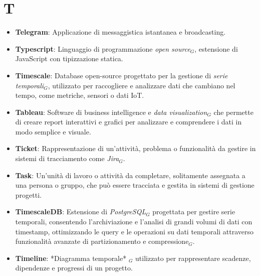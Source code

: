 \section{T}
\begin{itemize}
    \item \textbf{Telegram}: Applicazione di messaggistica istantanea e broadcasting.
    \item \textbf{Typescript}: Linguaggio di programmazione \textit{open source}$_G$, estensione di JavaScript con tipizzazione statica.
    \item \textbf{Timescale}: Database open-source progettato per la gestione di \textit{serie temporali$_G$}, utilizzato per raccogliere e analizzare dati che cambiano nel tempo, come metriche, sensori o dati IoT.
    \item \textbf{Tableau}: Software di business intelligence e \textit{data visualization$_G$} che permette di creare report interattivi e grafici per analizzare e comprendere i dati in modo semplice e visuale.
     \item \textbf{Ticket}: Rappresentazione di un’attività, problema o funzionalità da gestire in sistemi di tracciamento come \textit{Jira}$_G$.
     \item \textbf{Task}: Un'unità di lavoro o attività da completare, solitamente assegnata a una persona o gruppo, che può essere tracciata e gestita in sistemi di gestione progetti.
    \item \textbf{TimescaleDB}: Estensione di \textit{PostgreSQL}$_G$ progettata per gestire serie temporali, consentendo l'archiviazione e l'analisi di grandi volumi di dati con timestamp, ottimizzando le query e le operazioni su dati temporali attraverso funzionalità avanzate di partizionamento e compressione$_G$.
    \item \textbf{Timeline}: *Diagramma temporale* $_G$ utilizzato per rappresentare scadenze, dipendenze e progressi di un progetto.
\end{itemize}
